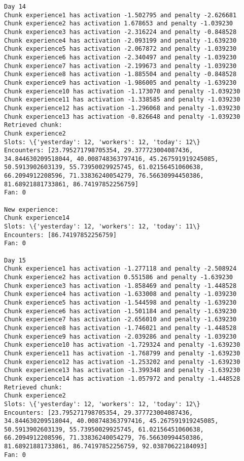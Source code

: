 \documentclass[11pt]{article}
\begin{document}
\begin{Verbatim}[commandchars=\\\{\}]
Day 14
Chunk experience1 has activation -1.502795 and penalty -2.626681
Chunk experience2 has activation 1.678653 and penalty -1.039230
Chunk experience3 has activation -2.316224 and penalty -0.848528
Chunk experience4 has activation -2.093199 and penalty -1.639230
Chunk experience5 has activation -2.067872 and penalty -1.039230
Chunk experience6 has activation -2.340497 and penalty -1.039230
Chunk experience7 has activation -2.199673 and penalty -1.039230
Chunk experience8 has activation -1.885504 and penalty -0.848528
Chunk experience9 has activation -1.986005 and penalty -1.639230
Chunk experience10 has activation -1.173070 and penalty -1.039230
Chunk experience11 has activation -1.338585 and penalty -1.039230
Chunk experience12 has activation -1.296068 and penalty -1.039230
Chunk experience13 has activation -0.826648 and penalty -1.039230
Retrieved chunk:
Chunk experience2
Slots: \{'yesterday': 12, 'workers': 12, 'today': 12\}
Encounters: [23.795271798705354, 29.377723004087436, 34.844630209518044, 40.008748363797416, 45.267591919245085, 50.5913902603139, 55.73950029925745, 61.02156451060638, 66.2094912208596, 71.33836240054279, 76.56630994450386, 81.68921881733861, 86.74197852256759]
Fan: 0

New experience:
Chunk experience14
Slots: \{'yesterday': 12, 'workers': 12, 'today': 11\}
Encounters: [86.74197852256759]
Fan: 0

Day 15
Chunk experience1 has activation -1.277118 and penalty -2.508924
Chunk experience2 has activation 0.551586 and penalty -1.639230
Chunk experience3 has activation -1.858469 and penalty -1.448528
Chunk experience4 has activation -1.633008 and penalty -1.039230
Chunk experience5 has activation -1.544598 and penalty -1.639230
Chunk experience6 has activation -1.501184 and penalty -1.639230
Chunk experience7 has activation -2.656010 and penalty -1.639230
Chunk experience8 has activation -1.746021 and penalty -1.448528
Chunk experience9 has activation -2.039286 and penalty -1.039230
Chunk experience10 has activation -1.729324 and penalty -1.639230
Chunk experience11 has activation -1.768799 and penalty -1.639230
Chunk experience12 has activation -1.253202 and penalty -1.639230
Chunk experience13 has activation -1.399348 and penalty -1.639230
Chunk experience14 has activation -1.057972 and penalty -1.448528
Retrieved chunk:
Chunk experience2
Slots: \{'yesterday': 12, 'workers': 12, 'today': 12\}
Encounters: [23.795271798705354, 29.377723004087436, 34.844630209518044, 40.008748363797416, 45.267591919245085, 50.5913902603139, 55.73950029925745, 61.02156451060638, 66.2094912208596, 71.33836240054279, 76.56630994450386, 81.68921881733861, 86.74197852256759, 92.03870622184093]
Fan: 0


\end{Verbatim}
\end{document}

